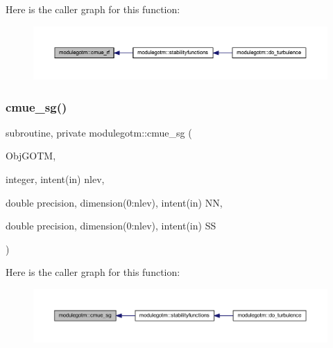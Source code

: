 Here is the caller graph for this function\+:\nopagebreak
\begin{figure}[H]
\begin{center}
\leavevmode
\includegraphics[width=350pt]{namespacemodulegotm_a9f8f0a6e92610182a87816932d096a5a_icgraph}
\end{center}
\end{figure}
\mbox{\label{namespacemodulegotm_a532d05762eb6990a602d72c0cf825f66}} 
\subsubsection{\texorpdfstring{cmue\+\_\+sg()}{cmue\_sg()}}
{\footnotesize\ttfamily subroutine, private modulegotm\+::cmue\+\_\+sg (\begin{DoxyParamCaption}\item[{}]{Obj\+G\+O\+TM,  }\item[{integer, intent(in)}]{nlev,  }\item[{double precision, dimension(0\+:nlev), intent(in)}]{NN,  }\item[{double precision, dimension(0\+:nlev), intent(in)}]{SS }\end{DoxyParamCaption})\hspace{0.3cm}{\ttfamily [private]}}

Here is the caller graph for this function\+:\nopagebreak
\begin{figure}[H]
\begin{center}
\leavevmode
\includegraphics[width=350pt]{namespacemodulegotm_a532d05762eb6990a602d72c0cf825f66_icgraph}
\end{center}
\end{figure}
\mbox{\label{namespacemodulegotm_af408ddba849a968ba4867373805e4b3b}} 
